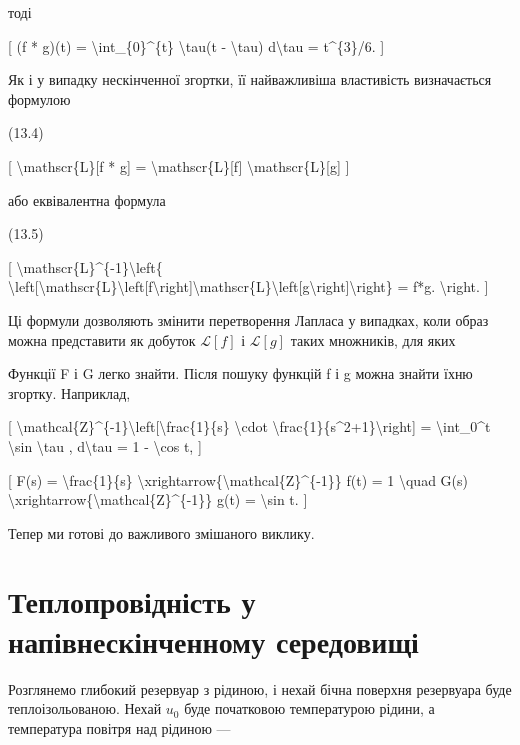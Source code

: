 \documentclass[
]{article}
\begin{document}
тоді

{[} (f * g)(t) = \textbackslash int\_\{0\}\^{}\{t\} \textbackslash tau(t
- \textbackslash tau) d\textbackslash tau = t\^{}\{3\}/6. {]}

Як і у випадку нескінченної згортки, її найважливіша властивість
визначається формулою

(13.4)

{[} \textbackslash mathscr\{L\}{[}f * g{]} =
\textbackslash mathscr\{L\}{[}f{]} \textbackslash mathscr\{L\}{[}g{]}
{]}

або еквівалентна формула

(13.5)

{[} \textbackslash mathscr\{L\}\^{}\{-1\}\textbackslash left\{
\textbackslash left{[}\textbackslash mathscr\{L\}\textbackslash left{[}f\textbackslash right{]}\textbackslash mathscr\{L\}\textbackslash left{[}g\textbackslash right{]}\textbackslash right\}
= f*g. \textbackslash right. {]}

Ці формули дозволяють змінити перетворення Лапласа у випадках, коли
образ можна представити як добуток \(\mathscr{L}[f]\) і
\(\mathscr{L}[g]\) таких множників, для яких

Функції F і G легко знайти. Після пошуку функцій f і g можна знайти їхню
згортку. Наприклад,

{[}
\textbackslash mathcal\{Z\}\^{}\{-1\}\textbackslash left{[}\textbackslash frac\{1\}\{s\}
\textbackslash cdot
\textbackslash frac\{1\}\{s\^{}2+1\}\textbackslash right{]} =
\textbackslash int\_0\^{}t \textbackslash sin \textbackslash tau ,
d\textbackslash tau = 1 - \textbackslash cos t, {]}

{[} F(s) = \textbackslash frac\{1\}\{s\}
\textbackslash xrightarrow\{\textbackslash mathcal\{Z\}\^{}\{-1\}\} f(t)
= 1 \textbackslash quad G(s)
\textbackslash xrightarrow\{\textbackslash mathcal\{Z\}\^{}\{-1\}\} g(t)
= \textbackslash sin t. {]}

Тепер ми готові до важливого змішаного виклику.

\section{Теплопровідність у напівнескінченному
середовищі}\label{ux442ux435ux43fux43bux43eux43fux440ux43eux432ux456ux434ux43dux456ux441ux442ux44c-ux443-ux43dux430ux43fux456ux432ux43dux435ux441ux43aux456ux43dux447ux435ux43dux43dux43eux43cux443-ux441ux435ux440ux435ux434ux43eux432ux438ux449ux456}

Розглянемо глибокий резервуар з рідиною, і нехай бічна поверхня
резервуара буде теплоізольованою. Нехай \(u_0\) буде початковою
температурою рідини, а температура повітря над рідиною ---
\end{document}
